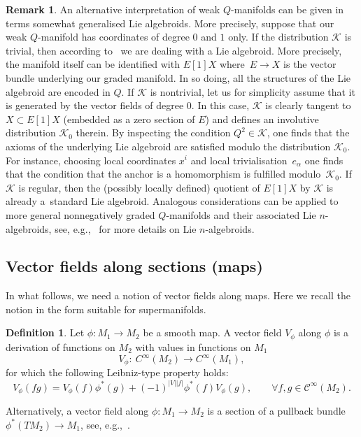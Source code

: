 \documentclass[10pt,a4paper]{amsart}
\numberwithin{equation}{section}
\theoremstyle{definition}
\newtheorem{Definition}[Theorem]{Definition}
\newtheorem{Remark}[Theorem]{Remark}
\newcommand{\p}[1]{|#1|}
\newcommand{\cC}{\mathcal{C}}
\def\cK{\mathcal{K}}
\begin{document}
\begin{Remark}
An alternative interpretation of weak $Q$-manifolds can be given in terms somewhat generalised Lie algebroids. More precisely, suppose that our weak $Q$-manifold has coordinates of degree $0$ and $1$ only. If the distribution $\cK$ is trivial, then according to~\cite{Vaintrob:1997} we are dealing with a Lie algebroid. More precisely, the manifold itself can be identified with $E[1]X$ where~${E \to X}$ is the vector bundle underlying our graded manifold. In so doing, all the structures of the Lie algebroid are encoded in $Q$. If $\cK$ is nontrivial, let us for simplicity assume that it is generated by the vector fields of degree $0$. In this case, $\cK$ is clearly tangent to $X \subset E[1]X$ (embedded as a zero section of $E$) and defines an involutive distribution $\cK_0$ therein.
By inspecting the condition $Q^2\in \cK$,
one finds that the axioms of the underlying Lie algebroid are satisfied modulo the distribution $\cK_0$. For instance, choosing local coordinates $x^i$ and local trivialisation~$e_\alpha$
one finds that the condition that the anchor is a homomorphism is fulfilled modulo~$\cK_0$. If~$\cK$ is regular, then the (possibly locally defined) quotient of $E[1]X$ by $\cK$ is already a~standard Lie algebroid. Analogous considerations can be applied to more general nonnegatively graded $Q$-manifolds and their associated Lie $n$-algebroids, see, e.g.,~\cite{Bonavolonta:2012fh,Severa:2001tze} for more details on Lie $n$-algebroids.
\end{Remark}

\subsection{Vector fields along sections (maps)}

In what follows, we need a notion of vector fields along maps. Here we recall the notion in the form suitable for supermanifolds.
\begin{Definition}
 Let $\phi\colon M_1\rightarrow M_2$ be a smooth map. A vector field $V_{\phi}$ along $\phi$ is a derivation of functions on $M_2$ with values in functions on $M_1$
 \begin{equation*}
 V_{\phi}\colon\ C^{\infty}(M_2)\rightarrow C^{\infty}(M_1),
 \end{equation*}
 for which the following Leibniz-type property holds:
 \begin{equation}\label{vam}
 V_{\phi}(fg)= V_{\phi}(f)\phi^*(g)+(-1)^{\p{V}\p{f}}\phi^*(f) V_{\phi}(g), \qquad \forall f,g\in \cC^{\infty}(M_2).
 \end{equation}
\end{Definition}
Alternatively, a vector field along $\phi\colon M_1\rightarrow M_2$ is a section of a pullback bundle $\phi^*(TM_2)\rightarrow M_1$, see, e.g.,~\cite{Lee2013}.
\end{document}
